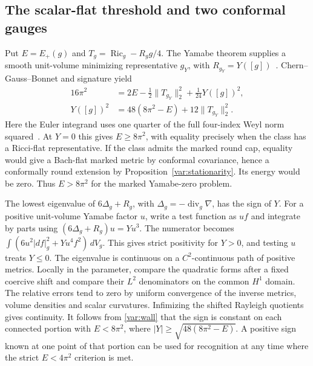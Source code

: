 \documentclass[11pt]{article}
\numberwithin{equation}{section}
\theoremstyle{definition}
\theoremstyle{remark}
\begin{document}
\subsection{The scalar-flat threshold and two conformal gauges}

Put \(E=E_+(g)\) and \(T_g=\operatorname{Ric}_g-R_g g/4\). The
Yamabe theorem supplies a smooth unit-volume minimizing
representative \(g_Y\), with \(R_{g_Y}=Y([g])\)~\cite[\S3, Theorem 3]{Schoen1984Yamabe}.
Chern--Gauss--Bonnet and signature yield
\begin{equation}\label{var:wall}
 \begin{aligned}
 16\pi^2&=2E-\tfrac12\|T_{g_Y}\|_2^2+\tfrac1{24}Y([g])^2,\\
 Y([g])^2&=48(8\pi^2-E)+12\|T_{g_Y}\|_2^2 .
 \end{aligned}
\end{equation}
Here the Euler integrand uses one quarter of the full
four-index Weyl norm squared~\cite[p.~107, (0.4) and Remark 2]{ChangGurskyYang2003}.
At \(Y=0\) this gives \(E\ge8\pi^2\), with equality precisely
when the class has a Ricci-flat representative. If the class
admits the marked round cap, equality would give a Bach-flat
marked metric by conformal covariance, hence a conformally
round extension by Proposition~\ref{var:stationarity}. Its
energy would be zero. Thus \(E>8\pi^2\) for the marked
Yamabe-zero problem.

The lowest eigenvalue of \(6\Delta_g+R_g\), with
\(\Delta_g=-\operatorname{div}_g\nabla\), has the sign of \(Y\).
For a positive unit-volume Yamabe factor \(u\), write a test
function as \(u f\) and integrate by parts using
\((6\Delta_g+R_g)u=Y u^3\). The numerator becomes
\(\int(6u^2|df|_g^2+Y u^4 f^2)\,dV_g\). This gives strict
positivity for \(Y>0\), and testing \(u\) treats \(Y\le0\).
The eigenvalue is continuous on a \(C^2\)-continuous path of
positive metrics. Locally in the parameter, compare the
quadratic forms after a fixed coercive shift and compare their
\(L^2\) denominators on the common \(H^1\) domain. The relative
errors tend to zero by uniform convergence of the inverse
metrics, volume densities and scalar curvatures. Infimizing the
shifted Rayleigh quotients gives continuity. It follows from
\eqref{var:wall} that the sign is constant on each connected
portion with \(E<8\pi^2\), where \(|Y|\ge\sqrt{48(8\pi^2-E)}\).
A positive sign known at one point
of that portion can be used for recognition at any time where
the strict \(E<4\pi^2\) criterion is met.
\end{document}
